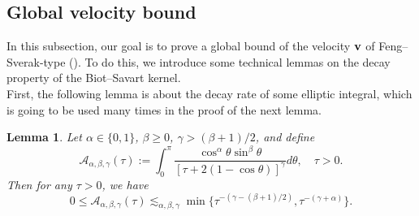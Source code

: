 \documentclass[11pt]{amsart}
\newtheorem{lem}[theorem]{Lemma}
\theoremstyle{definition}
\theoremstyle{remark}
\numberwithin{equation}{section}
\numberwithin{equation}{section}
\newcommand{\0}{\emptyset}
\newcommand{\alp}{\alpha}
\newcommand{\bt}{\beta}
\newcommand{\gmm}{\gamma}
\newcommand{\tht}{\theta}
\newcommand{\bfv}{{\bf v}}
\newcommand{\calA}{\mathcal A}
\newcommand{\calF}{\mathcal F}
\begin{document}
	\subsection{Global velocity bound}
	
	In this subsection, our goal is to prove a global bound of the velocity $\bfv$ of Feng--Sverak-type (\cite{FeSv}). To do this, we introduce some technical lemmas on the decay property of the Biot--Savart kernel. \\ First, the following lemma is about the decay rate of some elliptic integral, which is going to be used many times in the proof of the next lemma.
	\begin{lem}\label{lem:calAdecay}
		Let $\alp\in \{
		0,1\}$, $\bt\geq0$, $\gmm>(\bt+1)/2$, and define
		\begin{equation}
			\calA_{\alp,\bt,\gmm}(\tau):=\int_{0}^{\pi}\frac{\cos^{\alp}\tht\sin^{\bt}\tht}{[\tau+2(1-\cos\tht)]^{\gmm}}d\tht,\quad %
			\tau>0.
		\end{equation}
		Then for any $\tau>0$, we have
		\begin{equation}\label{eq:calAdecay}
			0\leq\calA_{\alp,\bt,\gmm}(\tau)\lesssim_{\alp,\bt,\gmm} \min\lbrace \tau^{-(\gmm-(\bt+1)/2)}, \tau^{-(\gmm+\alp)}\rbrace.
		\end{equation}
	\end{lem}
	
\end{document}
